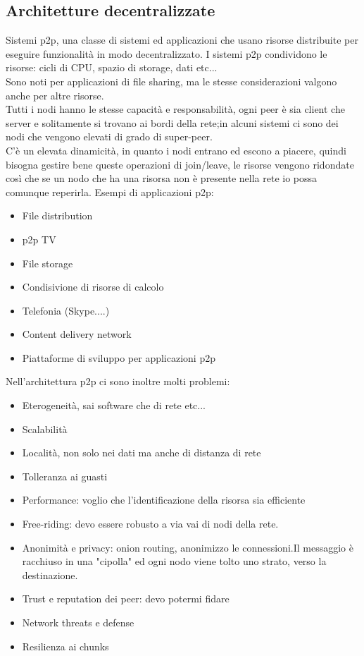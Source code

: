 \documentclass{article}
\begin{document}
\subsection{Architetture decentralizzate}
Sistemi p2p, una classe di sistemi ed applicazioni che usano risorse distribuite per eseguire funzionalità in modo decentralizzato. I sistemi p2p condividono le risorse: cicli di CPU, spazio di storage, dati etc...\\ Sono noti per applicazioni di file sharing, ma le stesse considerazioni valgono anche per altre risorse.\\ Tutti i nodi hanno le stesse capacità e responsabilità, ogni peer è sia client che server e solitamente si trovano ai bordi della rete;in alcuni sistemi ci sono dei nodi che vengono elevati di grado di super-peer.\\ C'è un elevata dinamicità, in quanto i nodi entrano ed escono a piacere, quindi bisogna gestire bene queste operazioni di join/leave, le risorse vengono ridondate così che se un nodo che ha una risorsa non è presente nella rete io possa comunque reperirla. Esempi di applicazioni p2p:
\begin{itemize}
\item File distribution
\item p2p TV
\item File storage
\item Condisivione di risorse di calcolo
\item Telefonia (Skype....)
\item Content delivery network
\item Piattaforme di sviluppo per applicazioni p2p
\end{itemize}
Nell'architettura p2p ci sono inoltre molti problemi:
\begin{itemize}
\item Eterogeneità, sai software che di rete etc...
\item Scalabilità
\item Località, non solo nei dati ma anche di distanza di rete
\item Tolleranza ai guasti
\item Performance: voglio che l'identificazione della risorsa sia efficiente
\item Free-riding: devo essere robusto a via vai di nodi della rete.
\item Anonimità e privacy: onion routing, anonimizzo le connessioni.Il messaggio è racchiuso in una "cipolla" ed ogni nodo viene tolto uno strato, verso la destinazione.
\item Trust e reputation dei peer: devo potermi fidare
\item Network threats e defense
\item Resilienza ai chunks
\end{itemize}
\end{document}
